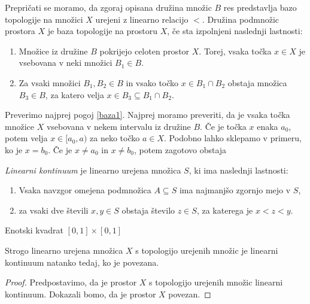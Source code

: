 \documentclass[mat2]{fmfdelo}
\begin{document}
Prepričati se moramo, da zgoraj opisana družina množic $B$ res predstavlja bazo topologije na množici $X$ urejeni z linearno relacijo $<$. Družina podmnožic prostora $X$ je baza topologije na prostoru $X$, če sta izpolnjeni naslednji lastnosti:
\begin{enumerate}[label={(b\arabic*)}]
\item Množice iz družine $B$ pokrijejo celoten prostor $X$. Torej, vsaka točka $x \in X$ je vsebovana v neki množici $B_1 \in B$. \label{baza1}
\item Za vsaki množici $B_1, B_2 \in B$ in vsako točko $x\in B_1 \cap B_2$ obstaja množica $B_3 \in B$, za katero velja $x \in B_3 \subseteq B_1 \cap B_2$.\label{baza2}
\end{enumerate}
Preverimo najprej pogoj \ref{baza1}.
 Najprej moramo preveriti, da je vsaka točka množice $X$ vsebovana v nekem intervalu iz družine $B$. Če je točka $x$ enaka $a_0$, potem velja $x \in [a_0, a)$ za neko točko $a \in X$. Podobno lahko sklepamo v primeru, ko je $x = b_0$. Če je $x \neq a_0$ in $x \neq b_0$, potem zagotovo obstaja

\begin{definicija}
\emph{Linearni kontinuum} je linearno urejena množica $S$, ki ima naslednji lastnosti:
\begin{enumerate}
\item Vsaka navzgor omejena podmnožica $A \subseteq S$ ima najmanjšo zgornjo mejo v $S$,
\item za vsaki dve števili $x, y \in S$ obstaja število $z \in S$, za katerega je $x<z<y$.
\end{enumerate}
\end{definicija}

\begin{primer}
Enotski kvadrat $[0, 1] \times [0, 1]$ 
\end{primer}

\begin{trditev}
Strogo linearno urejena množica $X$ s topologijo urejenih množic je linearni kontinuum natanko tedaj, ko je povezana.
\end{trditev}
\begin{proof}
Predpostavimo, da je prostor $X$ s topologijo urejenih množic linearni kontinuum. Dokazali bomo, da je prostor $X$ povezan.  
\end{proof}
\end{document}
